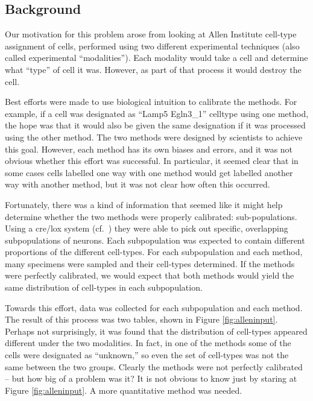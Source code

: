 \subsection{Background}

Our motivation for this problem arose from looking at Allen Institute cell-type assignment of cells, performed using two different experimental techniques (also called experimental ``modalities'').  Each modality would take a cell and determine what ``type'' of cell it was.  However, as part of that process it would destroy the cell.

Best efforts were made to use biological intuition to calibrate the methods.  For example, if a cell was designated as ``Lamp5 Egln3\_1'' celltype using one method, the hope was that it would also be given the same designation if it was processed using the other method.  The two methods were designed by scientists to achieve this goal.  However, each method has its own biases and errors, and it was not obvious whether this effort was successful.  In particular, it seemed clear that in some cases cells labelled one way with one method would get labelled another way with another method, but it was not clear how often this occurred.  

Fortunately, there was a kind of information that seemed like it might help determine whether the two methods were properly calibrated: sub-populations.  Using a cre/lox system (cf.\ \citep{tasic2017shared}) they were able to pick out specific, overlapping subpopulations of neurons.  Each subpopulation was expected to contain different proportions of the different cell-types.  For each subpopulation and each method, many specimens were sampled and their cell-types determined.  If the methods were perfectly calibrated, we would expect that both methods would yield the same distribution of cell-types in each subpopulation.  

Towards this effort, data was collected for each subpopulation and each method.  The result of this process was two tables, shown in Figure \ref{fig:alleninput}.  Perhaps not surprisingly, it was found that the distribution of cell-types appeared different under the two modalities.  In fact, in one of the methods some of the cells were designated as ``unknown,'' so even the set of cell-types was not the same between the two groups.  Clearly the methods were not perfectly calibrated -- but how big of a problem was it?  It is not obvious to know just by staring at Figure \ref{fig:alleninput}.  A more quantitative method was needed.  

